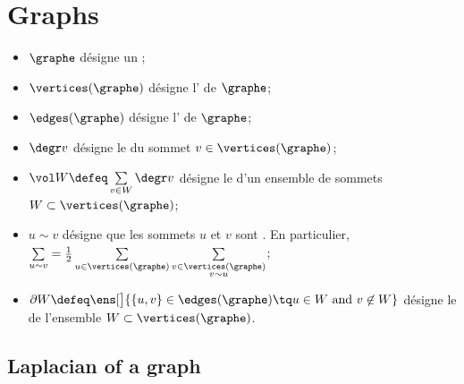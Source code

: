 \section{Graphs}

\begin{envide}[Notations]
\begin{itemize}
    \item $\graphe$ désigne un ;
    \item $\vertices(\graphe)$ désigne l' de $\graphe$;
    \item $\edges(\graphe)$ désigne l' de $\graphe$;
    \item $\degr v$ désigne le  du sommet $v \in \vertices(\graphe)$;
    \item $\vol W \defeq \sum\limits_{v \in W} \degr v$ désigne le  d'un ensemble de sommets $W \subset \vertices(\graphe)$;
    \item $u \sim v$ désigne que les sommets $u$ et $v$ sont . En particulier, $\sum\limits_{u \sim v} = \frac{1}{2} \sum\limits_{u \in \vertices(\graphe)} \sum\limits_{\substack{v \in \vertices(\graphe) \\ v \sim u}}$;
    \item $\partial W \defeq \ens[\big]{ \{u, v\} \in \edges(\graphe) \tq u \in W \text{ and } v \not\in W }$ désigne le  de l'ensemble $W \subset \vertices(\graphe)$.
\end{itemize}
\end{envide}

\subsection{Laplacian of a graph \texorpdfstring{{\cite[Sec. 1.2]{chung_lectures_nodate}}}{[Chu, Sec. 1.2]}}

